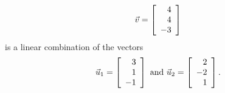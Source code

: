 \documentclass{ximera}
\author{Zack Reed}
\begin{document}
\begin{exercise}

\begin{equation*}
  \vect{v}= \startmat{r}
    4 \\
    4 \\
    -3
  \stopmat
\end{equation*}
is a linear combination of the vectors
\begin{equation*}
  \vect{u}_1 = \startmat{r}
    3 \\
    1 \\
    -1
  \stopmat
  \quad\mbox{and}\quad
  \vect{u}_2 =
  \startmat{r}
    2 \\
    -2 \\
    1
  \stopmat.
\end{equation*}

\end{exercise}
\end{document}
